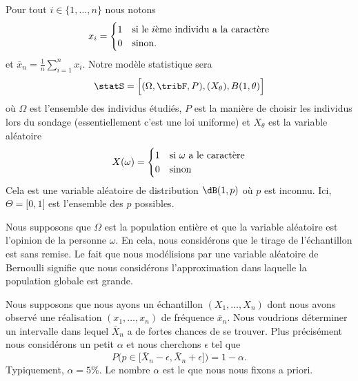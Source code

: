 Pour tout \( i\in\{ 1,\ldots, n \}\) nous notons
\begin{equation}
    x_i=\begin{cases}
        1    &   \text{si le \( i\)ème individu a la caractère}\\
        0    &    \text{sinon}.
    \end{cases}
\end{equation}
et \( \bar x_n=\frac{1}{ n }\sum_{i=1}^n x_i\). Notre modèle statistique sera
\begin{equation}
    \statS=\Big[ (\Omega,\tribF,P),(X_{\theta}),B(1,\theta) \Big]
\end{equation}
où \( \Omega\) est l'ensemble des individus étudiés, \( P\) est la manière de choisir les individus lors du sondage (essentiellement c'est une loi uniforme) et \( X_{\theta}\) est la variable aléatoire
\begin{equation}
    X(\omega)=\begin{cases}
        1    &   \text{si \( \omega\) a le caractère}\\
        0    &    \text{sinon}
    \end{cases}
\end{equation}
Cela est une variable aléatoire de distribution \( \dB(1,p)\) où \( p\) est inconnu. Ici, \( \Theta=\mathopen[ 0 , 1 \mathclose]\) est l'ensemble des \( p\) possibles.

\begin{remark}
    Nous supposons que \( \Omega\) est la population entière et que la variable aléatoire est l'opinion de la personne \( \omega\). En cela, nous considérons que le tirage de l'échantillon est sans remise. Le fait que nous modélisions par une variable aléatoire de Bernoulli signifie que nous considérons l'approximation dans laquelle la population globale est grande.
\end{remark}

Nous supposons que nous ayons un échantillon \( (X_1,\ldots,X_n)\) dont nous avons observé une réalisation \( (x_1,\ldots,x_n)\) de fréquence \( \bar x_n\). Nous voudrions déterminer un intervalle dans lequel \( \bar X_n\) a de fortes chances de se trouver. Plus précisément nous considérons un petit \( \alpha\) et nous cherchons \( \epsilon\) tel que
\begin{equation}
    P\big( p\in\mathopen[ \bar X_n-\epsilon , \bar X_n+\epsilon \mathclose] \big)=1-\alpha.
\end{equation}
Typiquement, \( \alpha=5\%\). Le nombre \( \alpha\) est le  que nous nous fixons a priori.

